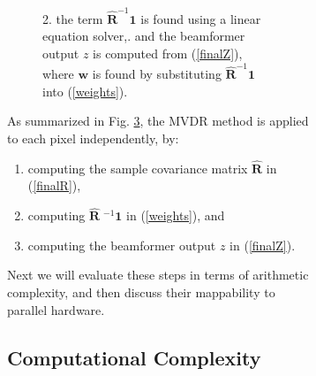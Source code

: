 \documentclass[12pt,journal,draftclsnofoot,onecolumn]{IEEEtran}
\let\MYoriglatexcaption\caption               %
\renewcommand{\caption}[2][\relax]{\MYoriglatexcaption[#2]{#2}}
\renewcommand\vec[1]{\boldsymbol{#1}}
\newcommand\mat[1]{\boldsymbol{#1}}
\newcommand\1{\vec 1}
\newcommand*\w{\vec w}
\newcommand*\eR{\mat{\hat R}}
\newcommand*\eRi{\hat{\mat R}\;\!^{-1}}
\begin{document}
\begin{figure}[H]
\begin{figure}[!t]
\begin{figure}[!t]
{2. the term $\eR^{-1}\1$ is found using a linear equation solver,. and the beamformer output $z$ is computed from (\ref{finalZ}), where $\w$ is found by substituting $\eR^{-1}\1$ into (\ref{weights}). } \label{mvdr_beamforming}
\end{figure}
As summarized in Fig. \ref{mvdr_beamforming}, the MVDR method is applied to each pixel independently, by:
\begin{enumerate}
\item computing the sample covariance matrix $\eR$ in (\ref{finalR}),
\item computing $\eRi\1$ in (\ref{weights}), and
\item computing the beamformer output $z$ in (\ref{finalZ}).
\end{enumerate}
Next we will evaluate these steps in terms of arithmetic complexity, and then discuss their mappability to parallel hardware.

\subsection{Computational Complexity}

 


\end{figure}
\end{figure}
\end{document}
